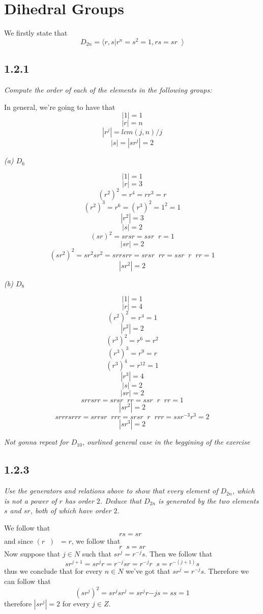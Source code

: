 \documentclass[11pt,oneside,titlepage]{book}
\DeclareMathOperator \inv {^{-1}}
\newcommand{\eangle}[1]{\langle #1 \rangle}
\begin{document}
\section{Dihedral Groups}

We firstly state that
$$D_{2n} = \eangle{r, s| r^n = s^2 = 1, rs = sr\inv}$$

\subsection*{1.2.1}

\textit{Compute the order of each of the elements in the following groups:}

In general, we're going to have that
$$|1| = 1$$
$$|r| = n$$
$$|r^j| = lcm(j, n) / j$$
$$|s| = |sr^j| = 2$$

\textit{(a) $D_6$}

$$|1| = 1$$
$$|r| = 3$$
$$(r^2)^2 = r^4 = r r^3 = r$$
$$(r^2)^3 = r^6 = (r^3)^2 = 1^2 = 1$$
$$|r^2| = 3$$
$$|s| = 2$$
$$(sr)^2 = srsr = ssr\inv r = 1$$
$$|sr| = 2$$
$$(sr^2)^2 = sr^2sr^2 = srrsrr = srsr\inv rr = ssr\inv r\inv r r = 1$$
$$|sr^2| = 2$$

\textit{(b) $D_8$}

$$|1| = 1$$
$$|r| = 4$$
$$(r^2)^2 = r^4 = 1$$
$$|r^2| = 2$$
$$(r^3)^2 = r^6 = r^2$$
$$(r^3)^3 = r^9 = r$$
$$(r^3)^4 = r^{12} = 1$$ 
$$|r^3| = 4$$
$$|s| = 2$$
$$|sr| = 2$$
$$srrsrr = srs r\inv rr = ssr\inv r\inv rr = 1$$
$$|sr^2| = 2$$
$$srrrsrrr = srr sr\inv rrr = sr s r\inv r\inv rrr = ss r^{-3}r^3 = 2$$
$$|sr^3| = 2$$

\textit{Not gonna repeat for $D_{10}$, ourlined general case in the beggining of the exercise}

\subsection*{1.2.3}

\textit{Use the generators and relations above to show that every element of $D_{2n}$,
  which is not a power of $r$ has order $2$. Deduce that $D_{2n}$ is generated by the
  two elements $s$ and $sr$, both of which have order $2$.}

We follow that
$$rs = s r\inv$$
and since $(r\inv)\inv = r$, we follow that
$$r\inv s = sr$$
Now suppose that $j \in N$ such that $sr^j = r^{-j}s$. Then we follow that
$$sr^{j + 1} = sr^{j} r = r^{-j} s r = r^{-j} r \inv s = r^{-(j + 1)}s$$
thus we conclude that for every $n \in N$ we've got that $sr^j = r^{-j}s$. Therefore
we can follow that
$$(sr^j)^2 = sr^j s r^j = s r^j r{-j} s = ss = 1$$
therefore $|sr^j| = 2$ for every $j \in Z$.
\end{document}
